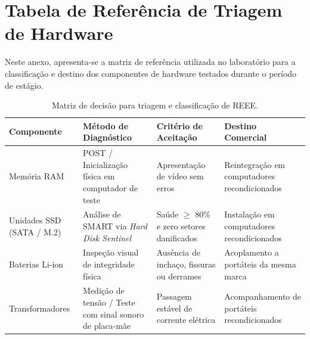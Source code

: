 \chapter{Tabela de Referência de Triagem de Hardware}\label{ap:tabela_triage}
\thispagestyle{fancy}

Neste anexo, apresenta-se a matriz de referência utilizada no laboratório para a classificação e destino dos componentes de hardware testados durante o período de estágio.

\begin{table}[H]
\centering
\caption{Matriz de decisão para triagem e classificação de \acs{REEE}.}
\label{tab:matriz_triagem}
\begin{tabularx}{\textwidth}{|p{3.2cm}|X|X|X|}
\hline
\textbf{Componente} & \textbf{Método de Diagnóstico} & \textbf{Critério de Aceitação} & \textbf{Destino Comercial} \\ \hline
Memória \acs{RAM} & POST / Inicialização física em computador de teste & Apresentação de vídeo sem erros & Reintegração em computadores recondicionados \\ \hline
Unidades \acs{SSD} (\acs{SATA} / M.2) & Análise de \acs{SMART} via \textit{Hard Disk Sentinel} & Saúde $\ge$ 80\% e zero setores danificados & Instalação em computadores recondicionados \\ \hline
Baterias Li-ion & Inspeção visual de integridade física & Ausência de inchaço, fissuras ou derrames & Acoplamento a portáteis da mesma marca \\ \hline
Transformadores & Medição de tensão / Teste com sinal sonoro de placa-mãe & Passagem estável de corrente elétrica & Acompanhamento de portáteis recondicionados \\ \hline
\end{tabularx}
\end{table}
